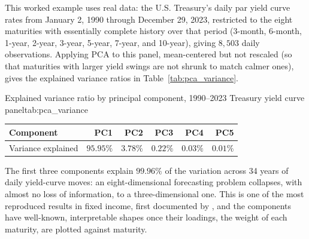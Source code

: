\documentclass[../ai_in_finance]{subfiles}
\begin{document}
This worked example uses real data: the U.S. Treasury's daily par yield curve rates from January 2, 1990 through December 29, 2023, restricted to the eight maturities with essentially complete history over that period (3-month, 6-month, 1-year, 2-year, 3-year, 5-year, 7-year, and 10-year), giving $8{,}503$ daily observations. Applying PCA to this panel, mean-centered but not rescaled (so that maturities with larger yield swings are not shrunk to match calmer ones), gives the explained variance ratios in Table~\ref{tab:pca_variance}.

\begin{booktable}[htbp]{Explained variance ratio by principal component, 1990--2023 Treasury yield curve panel}{tab:pca_variance}
\begin{tabular}{lrrrrr}
\toprule
Component & PC1 & PC2 & PC3 & PC4 & PC5 \\
\midrule
Variance explained & $95.95\%$ & $3.78\%$ & $0.22\%$ & $0.03\%$ & $0.01\%$ \\
\bottomrule
\end{tabular}
\end{booktable}

The first three components explain $99.96\%$ of the variation across 34 years of daily yield-curve moves: an eight-dimensional forecasting problem collapses, with almost no loss of information, to a three-dimensional one. This is one of the most reproduced results in fixed income, first documented by \textcite{litterman1991common}, and the components have well-known, interpretable shapes once their loadings, the weight of each maturity, are plotted against maturity.
\end{document}
